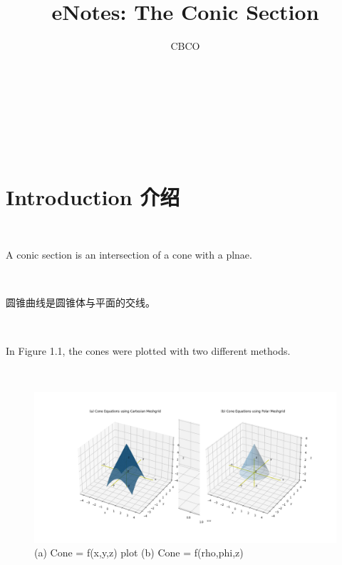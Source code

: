 \documentclass[10pt,a4paper,leqno]{article}
\author{CBCO}
\title{eNotes: The Conic Section}
\date{}
\begin{document}
\maketitle

\noindent {} %
\renewcommand{\theequation}{\thesection.\arabic{equation}}  
 \par \ \par\noindent {}
 \par \ \par\noindent \begin{CJK*}{UTF8}{gbsn}
 \par \ \par\noindent \section{Introduction 介绍}
 \par \ \par\noindent A conic section is an intersection of a cone with a plnae.
 \par \ \par\noindent 圆锥曲线是圆锥体与平面的交线。
 \par \ \par\noindent In Figure 1.1, the cones were plotted with two different methods.
 \par \ \par\begin{figure}[H]
\centering\includegraphics[width=1\linewidth,height=0.25\textheight]{Data/fgr01.png}
\caption{(a) Cone = f(x,y,z) plot (b) Cone = f(rho,phi,z) }
\label{fig:Data/fgr01.png}
\end{figure}


\end{CJK*}
\end{document}
